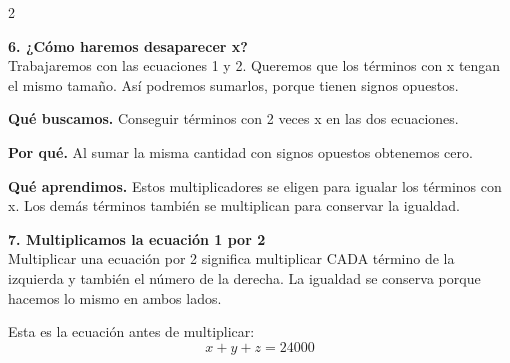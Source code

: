 \documentclass[11pt,a4paper,landscape]{article}
\begin{document}
\begin{multicols*}{2}
\noindent\begin{minipage}{\linewidth}\textbf{6. ¿Cómo haremos desaparecer x?}\\[2pt]Trabajaremos con las ecuaciones 1 y 2. Queremos que los términos con x tengan el mismo tamaño. Así podremos sumarlos, porque tienen signos opuestos.
\par\smallskip\textbf{Qué buscamos.} Conseguir términos con 2 veces x en las dos ecuaciones.
\par\smallskip\textbf{Por qué.} Al sumar la misma cantidad con signos opuestos obtenemos cero.
\par{}\par\smallskip
\par\smallskip\textbf{Qué aprendimos.} Estos multiplicadores se eligen para igualar los términos con x. Los demás términos también se multiplican para conservar la igualdad.
\end{minipage}\par\medskip
\noindent\begin{minipage}{\linewidth}\textbf{7. Multiplicamos la ecuación 1 por 2}\\[2pt]Multiplicar una ecuación por 2 significa multiplicar CADA término de la izquierda y también el número de la derecha. La igualdad se conserva porque hacemos lo mismo en ambos lados.
\par\smallskip Esta es la ecuación antes de multiplicar:
\[x + y + z = 24000\]
\par{}\par\smallskip

\end{minipage}
\end{multicols*}
\end{document}
